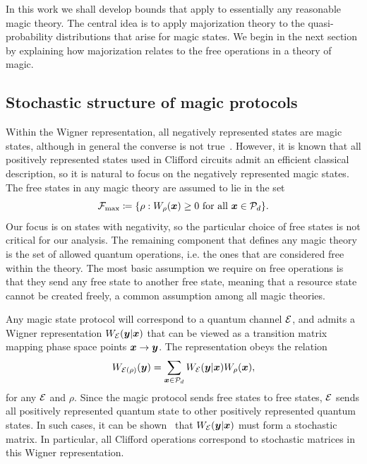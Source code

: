 \documentclass[pra,
aps,
twocolumn,
superscriptaddress,
groupedaddress,
nofootinbib,
reprint
]{revtex4-1}
\begin{document}
In this work we shall develop bounds that apply to essentially any reasonable magic theory. The central idea is to apply majorization theory to the quasi-probability distributions that arise for magic states. We begin in the next section by explaining how majorization relates to the free operations in a theory of magic.



\subsection{Stochastic structure of magic protocols}
\label{sec:struc}

Within the Wigner representation, all negatively represented states are magic states, although in general the converse is not true~\cite{cit:campbell}. However, it is known that all positively represented states used in Clifford circuits admit an efficient classical description, so it is natural to focus on the negatively represented magic states. The free states in any magic theory are assumed to lie in the set
\begin{equation}
    \Fmax \coloneqq \{ \rho: \W[\bmx]{\rho} \geq 0 \text{ for all } \bmx \in \cal{P}_d\}.
\end{equation}
Our focus is on states with negativity, so the particular choice of free states is not critical for our analysis. The remaining component that defines any magic theory is the set of allowed quantum operations, i.e. the ones that are considered free within the theory. The most basic assumption we require on free operations is that they send any free state to another free state, meaning that a resource state cannot be created freely, a common assumption among all magic theories.

Any magic state protocol will correspond to a quantum channel ${\mathcal E}$, and admits a Wigner representation $W_{{\mathcal E}}( \boldsymbol{y} | \boldsymbol{x})$ that can be viewed as a transition matrix mapping phase space points $\boldsymbol{x} \rightarrow \boldsymbol{y}$. The representation obeys the relation 
\begin{equation}
	W_{{\mathcal E}(\rho)} (\boldsymbol{y}) = \sum_{\boldsymbol{x} \in {\mathcal P}_d} W_{{\mathcal E}}( \boldsymbol{y} | \boldsymbol{x}) W_\rho(\boldsymbol{x}),
\end{equation}
for any ${\mathcal E}$ and $\rho$. Since the magic protocol sends free states to free states, ${\mathcal E}$ sends all positively represented quantum state to other positively represented quantum states. In such cases, it can be shown~\cite{Wang_2019} that $W_{{\mathcal E}}(\boldsymbol{y} |\boldsymbol{x})$ must form a stochastic matrix. In particular, all Clifford operations correspond to stochastic matrices in this Wigner representation. 
\end{document}
